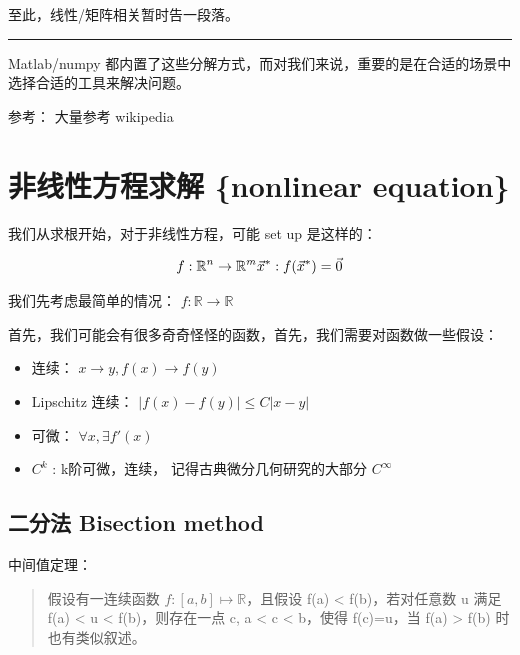 \documentclass[
]{book}
\providecommand{\tightlist}{%
  \setlength{\itemsep}{0pt}\setlength{\parskip}{0pt}}
\begin{document}
至此，线性/矩阵相关暂时告一段落。

\begin{center}\rule{0.5\linewidth}{0.5pt}\end{center}

Matlab/numpy 都内置了这些分解方式，而对我们来说，重要的是在合适的场景中选择合适的工具来解决问题。

参考：
大量参考 wikipedia

\hypertarget{ux975eux7ebfux6027ux65b9ux7a0bux6c42ux89e3-nonlinear-equation}{%
\chapter{非线性方程求解 \{nonlinear equation\}}\label{ux975eux7ebfux6027ux65b9ux7a0bux6c42ux89e3-nonlinear-equation}}

我们从求根开始，对于非线性方程，可能 set up 是这样的：

\[
f: \mathbb{R}^n \to \mathbb{R}^m \\
\vec{x}^* :  f(\vec{x}^* ) = \vec{0}
\]

我们先考虑最简单的情况： \(f : \mathbb{R} \to \mathbb{R}\)

首先，我们可能会有很多奇奇怪怪的函数，首先，我们需要对函数做一些假设：

\begin{itemize}
\tightlist
\item
  连续： \(x \to y, f(x) \to f(y)\)
\item
  Lipschitz 连续： \(| f(x) - f(y) | \le C |x - y|\)
\item
  可微： \(\forall x, \exists f'(x)\)
\item
  \(C^k\) : k阶可微，连续， 记得古典微分几何研究的大部分 \(C^\infty\)
\end{itemize}

\hypertarget{ux4e8cux5206ux6cd5-bisection-method}{%
\section{二分法 Bisection method}\label{ux4e8cux5206ux6cd5-bisection-method}}

中间值定理：

\begin{quote}
假设有一连续函数 \(f:[a,b]\mapsto \mathbb {R}\)，且假设 f(a) \textless{} f(b)，若对任意数 u 满足 f(a) \textless{} u \textless{} f(b)，则存在一点 c, a \textless{} c \textless{} b，使得 f(c)=u，当 f(a) \textgreater{} f(b) 时也有类似叙述。
\end{quote}
\end{document}
